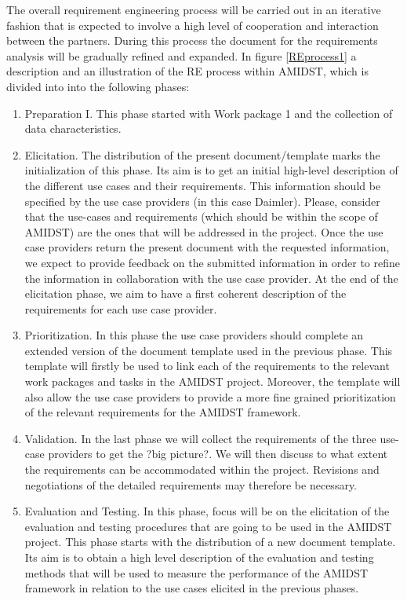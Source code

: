 \documentclass[11pt, oneside]{article}   	%
\begin{document}
The overall requirement engineering process will be carried out in an iterative fashion that is expected to involve a high level of cooperation and interaction between the partners. During this process the document for the requirements analysis will be gradually refined and expanded. In figure \ref{REprocess1} a description and an illustration of the RE process within AMIDST, which is divided into into the following phases:
\begin{enumerate}
 \item Preparation I.  This phase started with Work package 1 and the collection of data characteristics.  
 \item Elicitation. The distribution of the present document/template marks the initialization of this phase.  Its aim is to get an initial high-level description of the different use cases and their requirements. This information should be specified by the use case providers (in this case Daimler). Please, consider that the use-cases and requirements (which should be within the scope of AMIDST) are the ones that will be addressed in the project. Once the use case providers return the present document with the requested information, we expect to provide feedback on the submitted information in order to refine the information in collaboration with the use case provider. At the end of the elicitation phase, we aim to have a first coherent description of the requirements for each use case provider.
 \item Prioritization. In this phase the use case providers should complete an extended version of the document template used in the previous phase. This template will firstly be used to link each of the requirements to the relevant work packages and tasks in the AMIDST project. Moreover, the template will also allow the use case providers to provide a more fine grained prioritization of the relevant requirements for the AMIDST framework.  
 \item Validation. In the last phase we will collect the requirements of the three use-case providers to get the ?big picture?.  We will then discuss to what extent the requirements can be accommodated within the project. Revisions and negotiations of the detailed requirements may therefore be necessary.  
 \item Evaluation and Testing. In this phase, focus will be on the elicitation of the evaluation and testing procedures that are going to be used in the AMIDST project. This phase starts with the distribution of a new document template. Its aim is to obtain a high level description of the evaluation and testing methods that will be used to measure the performance of the AMIDST framework in relation to the use cases elicited in the previous phases.
\end{enumerate}
\end{document}
